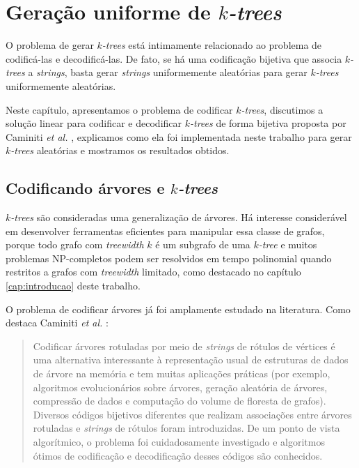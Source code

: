 \chapter{Geração uniforme de \emph{$k$-trees}}
\label{cap:geracao}

O problema de gerar \emph{$k$-trees} está intimamente relacionado ao problema de codificá-las e decodificá-las. De fato, se há uma codificação bijetiva que associa \emph{$k$-trees} a \emph{strings}, basta gerar \emph{strings} uniformemente aleatórias para gerar \emph{$k$-trees} uniformemente aleatórias.

Neste capítulo, apresentamos o problema de codificar \emph{$k$-trees}, discutimos a solução linear para codificar e decodificar \emph{$k$-trees} de forma bijetiva proposta por Caminiti \emph{et al.} \cite{caminiti}, explicamos como ela foi implementada neste trabalho para gerar \emph{$k$-trees} aleatórias e mostramos os resultados obtidos.

\section{Codificando árvores e \emph{$k$-trees}}

\emph{$k$-trees} \cite{harary} são consideradas uma generalização de árvores. Há interesse considerável em desenvolver ferramentas eficientes para manipular essa classe de grafos, porque todo grafo com \emph{treewidth} $k$ é um subgrafo de uma \emph{$k$-tree} e muitos problemas NP-completos podem ser resolvidos em tempo polinomial quando restritos a grafos com \emph{treewidth} limitado, como destacado no capítulo \ref{cap:introducao} deste trabalho.

\vspace{2em}

O problema de codificar árvores já foi amplamente estudado na literatura. Como destaca Caminiti \emph{et al.} \cite{caminiti}:

\begin{quotation}
  Codificar árvores rotuladas por meio de \emph{strings} de rótulos de vértices é uma alternativa interessante à representação usual de estruturas de dados de árvore na memória e tem muitas aplicações práticas (por exemplo, algoritmos evolucionários sobre árvores, geração aleatória de árvores, compressão de dados e computação do volume de floresta de grafos). Diversos códigos bijetivos diferentes que realizam associações entre árvores rotuladas e \emph{strings} de rótulos foram introduzidas. De um ponto de vista algorítmico, o problema foi cuidadosamente investigado e algoritmos ótimos de codificação e decodificação desses códigos são conhecidos.
\end{quotation}

